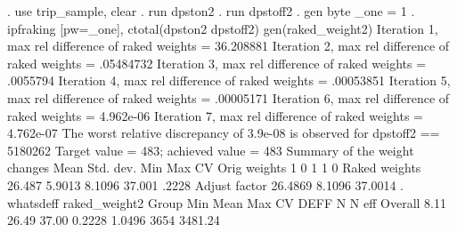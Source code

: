 . use trip_sample, clear
{\smallskip}
. run dpston2
{\smallskip}
. run dpstoff2
{\smallskip}
. gen byte _one = 1
{\smallskip}
. ipfraking [pw=_one], ctotal(dpston2 dpstoff2) gen(raked_weight2)
{\smallskip}
 Iteration 1, max rel difference of raked weights = 36.208881
 Iteration 2, max rel difference of raked weights = .05484732
 Iteration 3, max rel difference of raked weights = .0055794
 Iteration 4, max rel difference of raked weights = .00053851
 Iteration 5, max rel difference of raked weights = .00005171
 Iteration 6, max rel difference of raked weights = 4.962e-06
 Iteration 7, max rel difference of raked weights = 4.762e-07
The worst relative discrepancy of  3.9e-08 is observed for dpstoff2 == 5180262
Target value =        483; achieved value =        483
{\smallskip}
   Summary of the weight changes
{\smallskip}
              {\VBAR}    Mean    Std. dev.    Min        Max       CV
Orig weights  {\VBAR}        1          0         1           1       0
Raked weights {\VBAR}   26.487     5.9013    8.1096      37.001   .2228
Adjust factor {\VBAR}  26.4869               8.1096     37.0014
{\smallskip}
. whatsdeff raked_weight2
{\smallskip}
  Group   {\VBAR}   Min     {\VBAR}   Mean    {\VBAR}   Max     {\VBAR}    CV   {\VBAR}   DEFF  {\VBAR}   N   {\VBAR}  N eff
  Overall {\VBAR}      8.11 {\VBAR}     26.49 {\VBAR}     37.00 {\VBAR}  0.2228 {\VBAR}  1.0496 {\VBAR}  3654 {\VBAR} 3481.24
{\smallskip}
